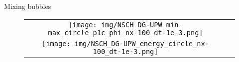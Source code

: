 \begin{frame}{Mixing bubbles}
  \small


\begin{minipage}{0.5\textwidth}
  \begin{figure}[htbp]
    \centering

    \if{}
        \fi
\end{figure}
\end{minipage}
\hfill
\begin{minipage}{0.4\textwidth}
    \begin{figure}[htbp]
        \centering
        \begin{tabular}{cc}
            \texttt{[image: img/NSCH\_DG-UPW\_min-max\_circle\_p1c\_phi\_nx-100\_dt-1e-3.png]} \\
            \texttt{[image: img/NSCH\_DG-UPW\_energy\_circle\_nx-100\_dt-1e-3.png]}
        \end{tabular}
        \label{cha6:fig:circle_max-min_energy}
    \end{figure}
\end{minipage}

\end{frame}

